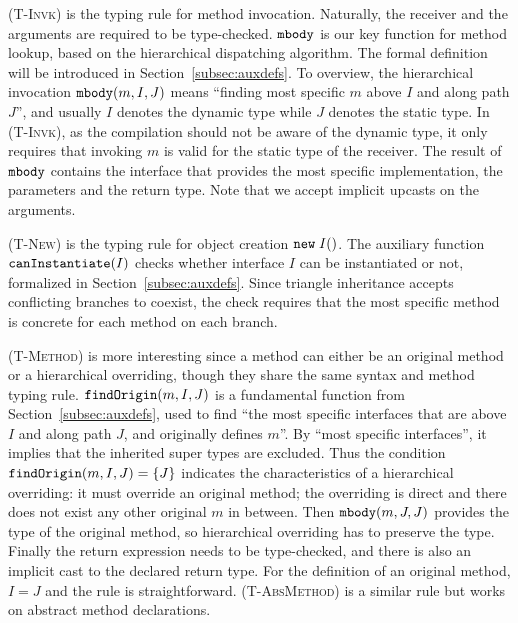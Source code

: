 \textsc{(T-Invk)} is the typing rule for method invocation.
Naturally, the receiver and the arguments are required to be type-checked.
$\texttt{mbody}$ is our key function for method lookup, based on the
hierarchical dispatching algorithm. The formal definition will be introduced in
Section~\ref{subsec:auxdefs}. To overview,
the hierarchical invocation $\texttt{mbody}(m, I, J)$ means ``finding most specific $m$
above $I$ and along path $J$'', and usually $I$ denotes the dynamic type while $J$
denotes the static type. In \textsc{(T-Invk)}, as the compilation should not be aware
of the dynamic type, it only requires that invoking $m$ is valid for the static type of the
receiver. The result of $\texttt{mbody}$ contains the interface that provides the most specific implementation,
the parameters and the return type. Note that we accept implicit upcasts on the arguments.

\textsc{(T-New)} is the typing rule for object creation $\texttt{new} \; I()$. The auxiliary function $\texttt{canInstantiate}(I)$ checks whether interface $I$ can be instantiated or not, formalized in Section~\ref{subsec:auxdefs}. Since triangle inheritance accepts conflicting branches to coexist, the check requires that the most specific method is concrete for each method on each branch.

\textsc{(T-Method)} is more interesting since a method can either be an original method or a hierarchical overriding, though
they share the same syntax and method typing rule. $\texttt{findOrigin}(m, I, J)$ is a fundamental function from Section~\ref{subsec:auxdefs},
used to find ``the most specific interfaces that are above $I$ and along path $J$, and originally defines $m$''. By ``most specific interfaces'',
it implies that the inherited super types are excluded. Thus the condition $\texttt{findOrigin}(m, I, J) = \{J\}$ indicates the characteristics of a hierarchical overriding: it must override an original method; the overriding is direct and there does not exist any other original $m$ in between.
Then $\texttt{mbody}(m, J, J)$ provides the type of the original method, so hierarchical overriding has to preserve the type. Finally the return expression
needs to be type-checked, and there is also an implicit cast to the declared return type. For the definition of an original method, $I = J$ and the rule is straightforward. \textsc{(T-AbsMethod)} is a similar rule but works on abstract method declarations.

